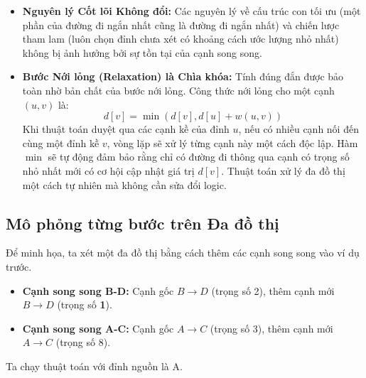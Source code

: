 \documentclass[a4paper,12pt]{article}
\begin{document}
\begin{itemize}
    \item \textbf{Nguyên lý Cốt lõi Không đổi:} Các nguyên lý về cấu trúc con tối ưu (một phần của đường đi ngắn nhất cũng là đường đi ngắn nhất) và chiến lược tham lam (luôn chọn đỉnh chưa xét có khoảng cách ước lượng nhỏ nhất) không bị ảnh hưởng bởi sự tồn tại của cạnh song song.

    \item \textbf{Bước Nới lỏng (Relaxation) là Chìa khóa:} Tính đúng đắn được bảo toàn nhờ bản chất của bước nới lỏng. Công thức nới lỏng cho một cạnh $(u, v)$ là:
    \[ d[v] = \min(d[v], d[u] + w(u, v)) \]
    Khi thuật toán duyệt qua các cạnh kề của đỉnh $u$, nếu có nhiều cạnh nối đến cùng một đỉnh kề $v$, vòng lặp sẽ xử lý từng cạnh này một cách độc lập. Hàm $\min$ sẽ tự động đảm bảo rằng chỉ có đường đi thông qua cạnh có trọng số nhỏ nhất mới có cơ hội cập nhật giá trị $d[v]$. Thuật toán xử lý đa đồ thị một cách tự nhiên mà không cần sửa đổi logic.
\end{itemize}

\subsection{Mô phỏng từng bước trên Đa đồ thị}
Để minh họa, ta xét một đa đồ thị bằng cách thêm các cạnh song song vào ví dụ trước.
\begin{itemize}
    \item \textbf{Cạnh song song B-D:} Cạnh gốc $B \to D$ (trọng số 2), thêm cạnh mới $B \to D$ (trọng số \textbf{1}).
    \item \textbf{Cạnh song song A-C:} Cạnh gốc $A \to C$ (trọng số 3), thêm cạnh mới $A \to C$ (trọng số 8).
\end{itemize}
Ta chạy thuật toán với đỉnh nguồn là A.
\end{document}
